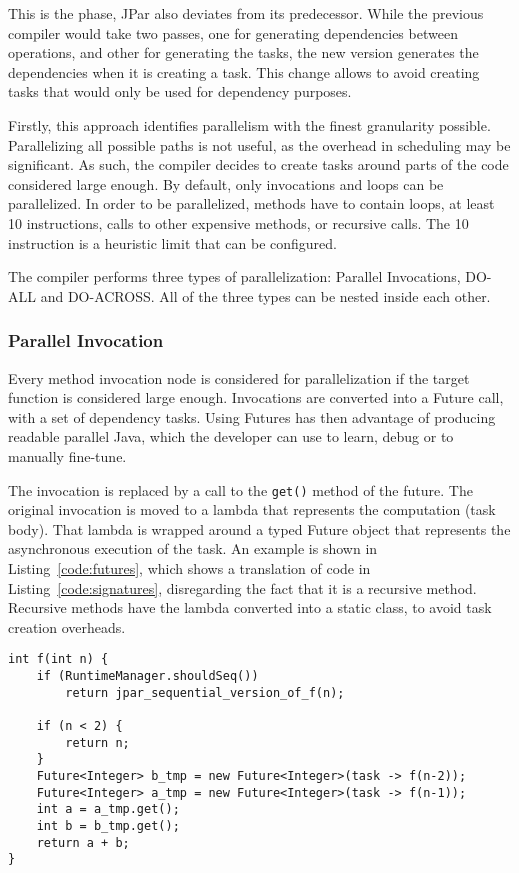 \documentclass[smallextended]{svjour3}
\begin{document}
This is the phase, JPar also deviates from its predecessor. While the previous compiler would take two passes, one for generating dependencies between operations, and other for generating the tasks, the new version generates the dependencies when it is creating a task. This change allows to avoid creating tasks that would only be used for dependency purposes.


Firstly, this approach identifies parallelism with the finest granularity possible. Parallelizing all possible paths is not useful, as the overhead in scheduling may be significant. As such, the compiler decides to create tasks around parts of the code considered large enough. By default, only invocations and loops can be parallelized. In order to be parallelized, methods have to contain loops, at least 10 instructions, calls to other expensive methods, or recursive calls. The 10 instruction is a heuristic limit that can be configured.

The compiler performs three types of parallelization: Parallel Invocations, DO-ALL and DO-ACROSS. All of the three types can be nested inside each other.

\subsubsection{Parallel Invocation}

Every method invocation node is considered for parallelization if the target function is considered large enough. Invocations are converted into a Future call\cite{swaine2010back}, with a set of dependency tasks. Using Futures has then advantage of producing readable parallel Java, which the developer can use to learn, debug or to manually fine-tune.

The invocation is replaced by a call to the \verb|get()| method of the future. The original invocation is moved to a lambda that represents the computation (task body). That lambda is wrapped around a typed Future object that represents the asynchronous execution of the task. An example is shown in Listing~\ref{code:futures}, which shows a translation of code in Listing~\ref{code:signatures}, disregarding the fact that it is a recursive method. Recursive methods have the lambda converted into a static class, to avoid task creation overheads.

\vspace{15mm}

\begin{lstlisting}
int f(int n) {
    if (RuntimeManager.shouldSeq())
        return jpar_sequential_version_of_f(n);

    if (n < 2) {
        return n;
    }
    Future<Integer> b_tmp = new Future<Integer>(task -> f(n-2));
    Future<Integer> a_tmp = new Future<Integer>(task -> f(n-1));
    int a = a_tmp.get();
    int b = b_tmp.get();
    return a + b;
}
\end{lstlisting}
\end{document}

